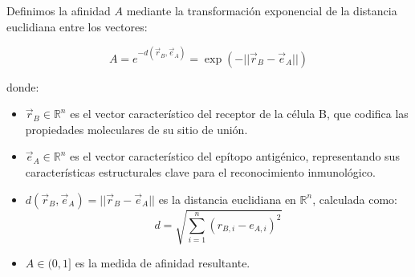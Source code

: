     Definimos la afinidad $A$ mediante la transformación exponencial de la distancia euclidiana entre los vectores:

    \begin{equation}
    A = e^{-d(\vec{r}_{B}, \vec{e}_{A})} = \exp\left({-||\vec{r}_{B} - \vec{e}_{A}||}\right)
    \end{equation}

    donde:
    \begin{itemize}
        \item $\vec{r}_B \in \mathbb{R}^n$ es el vector característico del receptor de la célula B, que codifica las propiedades moleculares de su sitio de unión.
        
        \item $\vec{e}_A \in \mathbb{R}^n$ es el vector característico del epítopo antigénico, representando sus características estructurales clave para el reconocimiento inmunológico.
        
        \item $d(\vec{r}_{B}, \vec{e}_{A}) = ||\vec{r}_{B} - \vec{e}_{A}||$ es la distancia euclidiana en $\mathbb{R}^n$, calculada como:
        \begin{equation}
        d = \sqrt{\sum_{i=1}^{n} (r_{B,i} - e_{A,i})^2}
        \end{equation}
        
        \item $A \in (0,1]$ es la medida de afinidad resultante.
    \end{itemize}


